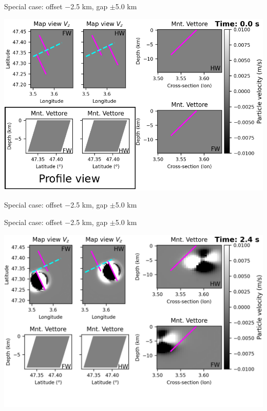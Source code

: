 \documentclass{beamer}
\begin{document}
\begin{frame}
 {Special case: offset $-$2.5 km, gap $\pm$5.0 km}

\begin{center}
    \includegraphics[width=1\linewidth]{images/horizontal_delta_00000c}
\end{center}
\addtocounter{framenumber}{-1}
 
\end{frame}


\begin{frame}
 {Special case: offset $-$2.5 km, gap $\pm$5.0 km}

\begin{center}
\end{center}
\addtocounter{framenumber}{-1}
 
\end{frame}


\begin{frame}
 {Special case: offset $-$2.5 km, gap $\pm$5.0 km}

\begin{center}
    \includegraphics[width=1\linewidth]{images/video_waves/horizontal_delta_00012}
\end{center}
\addtocounter{framenumber}{-1}

\end{frame}
\end{document}
